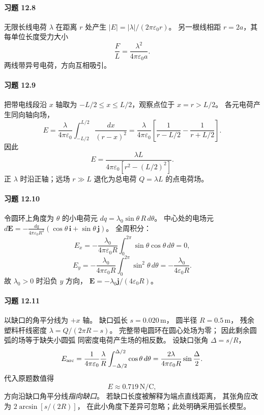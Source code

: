 \paragraph{习题 12.8}
无限长线电荷 \(\lambda\) 在距离 \(r\) 处产生
\(|E|=|\lambda|/(2\pi\varepsilon_0r)\)。
另一根线相距 \(r=2a\)，其每单位长度受力大小
\[
 \boxed{\frac FL=\frac{\lambda^2}{4\pi\varepsilon_0a}}.
\]
两线带异号电荷，方向互相吸引。

\paragraph{习题 12.9}
把带电线段沿 \(x\) 轴取为
\(-L/2\le x\le L/2\)，观察点位于 \(x=r>L/2\)。
各元电荷产生同向轴向场，
\[
 E=\frac{\lambda}{4\pi\varepsilon_0}
 \int_{-L/2}^{L/2}\frac{dx}{(r-x)^2}
 =\frac{\lambda}{4\pi\varepsilon_0}
 \left[\frac1{r-L/2}-\frac1{r+L/2}\right].
\]
因此
\[
 \boxed{E=\frac{\lambda L}
 {4\pi\varepsilon_0[r^2-(L/2)^2]}}.
\]
正 \(\lambda\) 时沿正轴；远场 \(r\gg L\)
退化为总电荷 \(Q=\lambda L\) 的点电荷场。

\paragraph{习题 12.10}
令圆环上角度为 \(\theta\) 的小电荷元
\(dq=\lambda_0\sin\theta\,R\,d\theta\)。
中心处的电场元
\(d\boldsymbol E=
-\frac{dq}{4\pi\varepsilon_0R^2}
(\cos\theta\,\boldsymbol i+\sin\theta\,\boldsymbol j)\)。
全周积分：
\[
 E_x=-\frac{\lambda_0}{4\pi\varepsilon_0R}
 \int_0^{2\pi}\sin\theta\cos\theta\,d\theta=0,
\]
\[
 E_y=-\frac{\lambda_0}{4\pi\varepsilon_0R}
 \int_0^{2\pi}\sin^2\theta\,d\theta
 =-\frac{\lambda_0}{4\varepsilon_0R}.
\]
故 \(\lambda_0>0\) 时沿负 \(y\) 方向，
\(\boxed{\boldsymbol E=-\lambda_0\boldsymbol j/(4\varepsilon_0R)}\)。

\paragraph{习题 12.11}
以缺口的角平分线为 \(+x\) 轴。
缺口弧长 \(s=0.020\,\mathrm m\)，
圆半径 \(R=0.5\,\mathrm m\)，
残余塑料杆线密度
\(\lambda=Q/(2\pi R-s)\)。
完整带电圆环在圆心处场为零；
因此剩余圆弧的场等于缺失小圆弧
同密度电荷产生场的相反数。
设缺口张角 \(\Delta=s/R\)，
\[
 E_{\rm arc}=
 \frac{1}{4\pi\varepsilon_0}
 \frac{\lambda}{R}\int_{-\Delta/2}^{\Delta/2}
 \cos\theta\,d\theta
 =\frac{2\lambda}{4\pi\varepsilon_0R}
 \sin\frac{\Delta}{2}.
\]
代入原题数值得
\[
 \boxed{E\approx0.719\,\mathrm{N/C}},
\]
方向沿缺口角平分线\emph{指向缺口}。
若缺口长度被解释为端点直线距离，
其张角应改为 \(2\arcsin[s/(2R)]\)，
在此小角度下差异可忽略；此处明确采用弧长模型。

